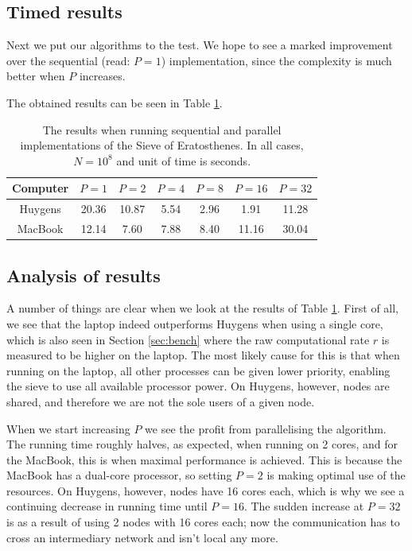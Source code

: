 \documentclass[a4paper]{article}
\begin{document}
\subsection{Timed results}
Next we put our algorithms to the test. We hope to see a marked improvement over
the sequential (read: $P=1$) implementation, since the complexity is much better
when $P$ increases. 

The obtained results can be seen in Table \ref{tbl:results}. 

\begin{table}
    \centering
    \begin{tabular}{c|cccccc}
        Computer & $P=1$ & $P=2$ & $P=4$& $P=8$& $P=16$& $P=32$    \\
        \hline
        Huygens & 20.36 & 10.87 & 5.54 & 2.96 & 1.91 & 11.28 \\
        MacBook & 12.14 &  7.60 & 7.88 & 8.40 &11.16 & 30.04 \\
        \hline
    \end{tabular}
    \caption{The results when running sequential and parallel implementations of
    the Sieve of Eratosthenes. In all cases, $N=10^8$ and unit of time is
    seconds. }
    \label{tbl:results}
\end{table}


\subsection{Analysis of results}

A number of things are clear when we look at the results of Table
\ref{tbl:results}. First of all, we see that the laptop indeed outperforms
Huygens when using a single core, which is also seen in Section \ref{sec:bench}
where the raw computational rate $r$ is measured to be higher on the laptop. The
most likely cause for this is that when running on the laptop, all other
processes can be given lower priority, enabling the sieve to use all available
processor power. On Huygens, however, nodes are shared, and therefore we are not
the sole users of a given node. 

When we start increasing $P$ we see the profit from parallelising the algorithm.
The running time roughly halves, as expected, when running on 2 cores, and for
the MacBook, this is when maximal performance is achieved. This is because the
MacBook has a dual-core processor, so setting $P=2$ is making optimal use of the
resources. On Huygens, however, nodes have 16 cores each, which is why we see a
continuing decrease in running time until $P=16$. The sudden increase at $P=32$
is as a result of using 2 nodes with 16 cores each; now the communication has to
cross an intermediary network and isn't local any more. 
\end{document}
